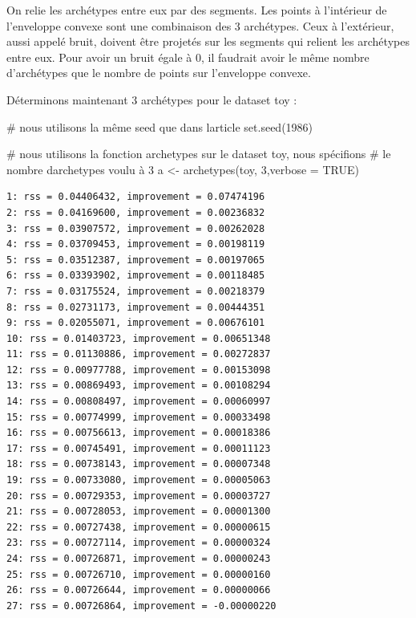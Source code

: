 \documentclass{article}
\newenvironment{Shaded}{\begin{snugshade}}{\end{snugshade}}
\newcommand{\AttributeTok}[1]{\textcolor[rgb]{0.40,0.45,0.13}{#1}}
\newcommand{\CommentTok}[1]{\textcolor[rgb]{0.37,0.37,0.37}{#1}}
\newcommand{\ConstantTok}[1]{\textcolor[rgb]{0.56,0.35,0.01}{#1}}
\newcommand{\DecValTok}[1]{\textcolor[rgb]{0.68,0.00,0.00}{#1}}
\newcommand{\FunctionTok}[1]{\textcolor[rgb]{0.28,0.35,0.67}{#1}}
\newcommand{\NormalTok}[1]{\textcolor[rgb]{0.00,0.23,0.31}{#1}}
\newcommand{\OtherTok}[1]{\textcolor[rgb]{0.00,0.23,0.31}{#1}}
\begin{document}
On relie les archétypes entre eux par des segments. Les points à
l'intérieur de l'enveloppe convexe sont une combinaison des 3
archétypes. Ceux à l'extérieur, aussi appelé bruit, doivent être
projetés sur les segments qui relient les archétypes entre eux. Pour
avoir un bruit égale à 0, il faudrait avoir le même nombre d'archétypes
que le nombre de points sur l'enveloppe convexe.

Déterminons maintenant 3 archétypes pour le dataset toy :

\begin{Shaded}
\begin{Highlighting}[]
\CommentTok{\# nous utilisons la même seed que dans l\textquotesingle{}article}
\FunctionTok{set.seed}\NormalTok{(}\DecValTok{1986}\NormalTok{)}

\CommentTok{\# nous utilisons la fonction archetypes sur le dataset toy, nous spécifions  }
\CommentTok{\# le nombre d\textquotesingle{}archetypes voulu à 3}
\NormalTok{a }\OtherTok{\textless{}{-}} \FunctionTok{archetypes}\NormalTok{(toy, }\DecValTok{3}\NormalTok{,}\AttributeTok{verbose =} \ConstantTok{TRUE}\NormalTok{)}
\end{Highlighting}
\end{Shaded}

\begin{verbatim}
1: rss = 0.04406432, improvement = 0.07474196
2: rss = 0.04169600, improvement = 0.00236832
3: rss = 0.03907572, improvement = 0.00262028
4: rss = 0.03709453, improvement = 0.00198119
5: rss = 0.03512387, improvement = 0.00197065
6: rss = 0.03393902, improvement = 0.00118485
7: rss = 0.03175524, improvement = 0.00218379
8: rss = 0.02731173, improvement = 0.00444351
9: rss = 0.02055071, improvement = 0.00676101
10: rss = 0.01403723, improvement = 0.00651348
11: rss = 0.01130886, improvement = 0.00272837
12: rss = 0.00977788, improvement = 0.00153098
13: rss = 0.00869493, improvement = 0.00108294
14: rss = 0.00808497, improvement = 0.00060997
15: rss = 0.00774999, improvement = 0.00033498
16: rss = 0.00756613, improvement = 0.00018386
17: rss = 0.00745491, improvement = 0.00011123
18: rss = 0.00738143, improvement = 0.00007348
19: rss = 0.00733080, improvement = 0.00005063
20: rss = 0.00729353, improvement = 0.00003727
21: rss = 0.00728053, improvement = 0.00001300
22: rss = 0.00727438, improvement = 0.00000615
23: rss = 0.00727114, improvement = 0.00000324
24: rss = 0.00726871, improvement = 0.00000243
25: rss = 0.00726710, improvement = 0.00000160
26: rss = 0.00726644, improvement = 0.00000066
27: rss = 0.00726864, improvement = -0.00000220
\end{verbatim}
\end{document}
